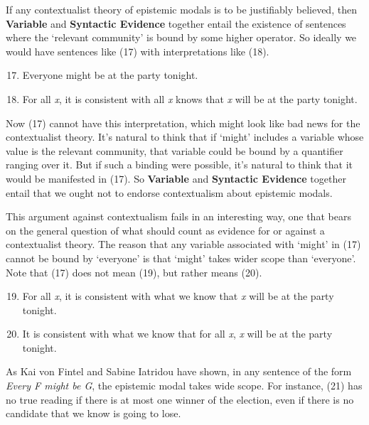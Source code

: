 \noindent If any contextualist theory of epistemic modals is to be justifiably believed, then \textbf{Variable} and \textbf{Syntactic Evidence} together entail the existence of sentences where the `relevant community' is bound by some higher operator. So ideally we would have sentences like (17) with interpretations like (18).
 
\begin{enumerate}
\setcounter{enumi}{16} 
\item Everyone might be at the party tonight.
\item For all \textit{x}, it is consistent with all \textit{x} knows that \textit{x} will be at the party tonight.
\end{enumerate}

\noindent Now (17) cannot have this interpretation, which might look like bad news for the contextualist theory. It's natural to think that if `might' includes a variable whose value is the relevant community, that variable could be bound by a quantifier ranging over it. But if such a binding were possible, it's natural to think that it would be manifested in (17). So \textbf{Variable} and \textbf{Syntactic Evidence} together entail that we ought not to endorse contextualism about epistemic modals.
 
This argument against contextualism fails in an interesting way, one that bears on the general question of what should count as evidence for or against a contextualist theory. The reason that any variable associated with `might' in (17) cannot be bound by `everyone' is that `might' takes wider scope than `everyone'. Note that (17) does not mean (19), but rather means (20).
 
\begin{enumerate}
\setcounter{enumi}{18} 
\item For all \textit{x}, it is consistent with what we know that \textit{x} will be at the party tonight.
\item It is consistent with what we know that for all \textit{x}, \textit{x} will be at the party tonight.
\end{enumerate}

\noindent As Kai von Fintel and Sabine Iatridou \citeyearpar{vonFintel2003} have shown, in any sentence of the form \textit{Every F might be G}, the epistemic modal takes wide scope. For instance, (21) has no true reading if there is at most one winner of the election, even if there is no candidate that we know is going to lose.

